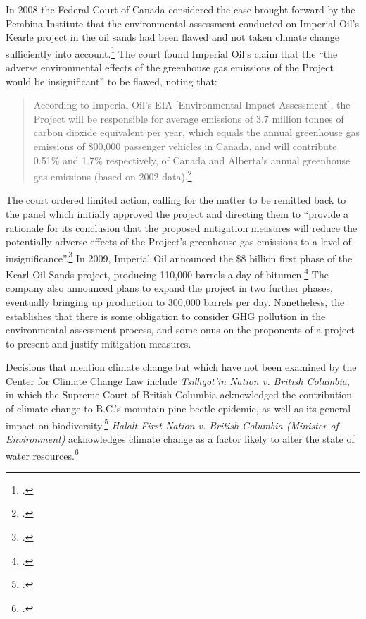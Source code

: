 In 2008 the Federal Court of Canada considered the case brought forward by the Pembina Institute that the environmental assessment conducted on Imperial Oil's Kearle project in the oil sands had been flawed and not taken climate change sufficiently into account.\footcite[][p. 116]{ColumbiaIntl}
The court found Imperial Oil's claim that the ``the adverse environmental effects of the greenhouse gas emissions of the Project would be insignificant'' to be flawed, noting that:
\begin{quote}
According to Imperial Oil’s EIA [Environmental Impact Assessment], the Project will be responsible for average emissions of 3.7 million tonnes of carbon dioxide equivalent per year, which equals the annual greenhouse gas emissions of 800,000 passenger vehicles in Canada, and will contribute 0.51\% and 1.7\% respectively, of Canada and Alberta’s annual greenhouse gas emissions (based on 2002 data).\footcite[][]{PembinaAG2008}
\end{quote}
The court ordered limited action, calling for the matter to be remitted back to the panel which initially approved the project and directing them to ``provide a rationale for its conclusion that the proposed mitigation measures will reduce the potentially adverse effects of the Project’s greenhouse gas emissions to a level of insignificance''.\footcite[][]{PembinaAG2008}
In 2009, Imperial Oil announced the \$8 billion first phase of the Kearl Oil Sands project, producing 110,000 barrels a day of bitumen.\footcite[][]{KearlApproved}
The company also announced plans to expand the project in two further phases, eventually bringing up production to 300,000 barrels per day.
Nonetheless, the establishes that there is some obligation to consider GHG pollution in the environmental assessment process, and some onus on the proponents of a project to present and justify mitigation measures.



Decisions that mention climate change but which have not been examined by the Center for Climate Change Law include \emph{Tsilhqot’in Nation v. British Columbia}, in which the Supreme Court of British Columbia acknowledged the contribution of climate change to B.C.'s mountain pine beetle epidemic, as well as its general impact on biodiversity.\footcite[][p. 358, 406]{Tsilhqotin}
\emph{Halalt First Nation v. British Columbia (Minister of Environment)} acknowledges climate change as a factor likely to alter the state of water resources.\footcite[][]{Halalt}



